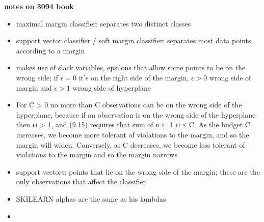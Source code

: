 \documentclass{article}
\begin{document}
\textbf{notes on 3094 book}
\begin{itemize}
    \item maximal margin classifier: separates two distinct classes
    \item support vector classifier / soft margin classifier: separates most data points according to a margin
    \item makes use of slack variables, epsilons that allow some points to be on the wrong side; if $\epsilon=0$ it's on the right side of the margin, $\epsilon>0$ wrong side of margin and $\epsilon>1$ wrong side of hyperplane
    \item For C > 0 no more than C observations can be on the wrong side of the hyperplane, because if an observation
is on the wrong side of the hyperplane then ϵi > 1, and (9.15) requires
that sum of n
i=1 ϵi ≤ C. As the budget C increases, we become more tolerant of
violations to the margin, and so the margin will widen. Conversely, as C
decreases, we become less tolerant of violations to the margin and so the
margin narrows.
    \item support vectors: points that lie on the wrong side of the margin; these are the only observations that affect the classifier
\end{itemize}

\begin{itemize}
    \item SKILEARN alphas are the same as his lambdas
    \item 
\end{itemize}
\end{document}
